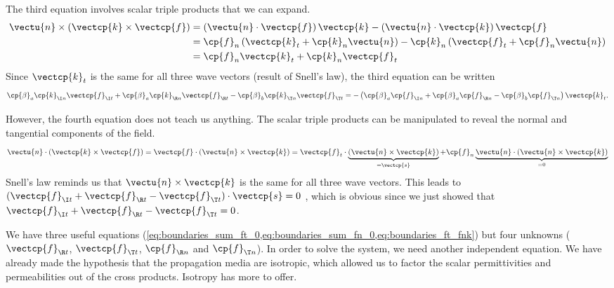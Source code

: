 \begin{refsection}
The third equation involves scalar triple products that we can expand.
\begin{subequations}
    \begin{align}
        \vectu{n} \times \left( \vectcp{k} \times \vectcp{f} \right)
        &=
        \left( \vectu{n} \cdot \vectcp{f} \right) \vectcp{k}
        -
        \left( \vectu{n} \cdot \vectcp{k} \right) \vectcp{f}
        \\
        &=
        \cp{f}_n \left( \vectcp{k}_t + \cp{k}_n \vectu{n} \right)
        -
        \cp{k}_n \left( \vectcp{f}_t + \cp{f}_n \vectu{n} \right)
        \\
        &=
        \cp{f}_n \vectcp{k}_t + \cp{k}_n \vectcp{f}_t
    \end{align}
\end{subequations}
Since $\vectcp{k}_t$ is the same for all three wave vectors (result of Snell's law), the third equation can be written
\begin{equation}
    \cp{\beta}_a \cp{k}_{\I n} \vectcp{f}_{\I t}
    +
    \cp{\beta}_a \cp{k}_{\R n} \vectcp{f}_{\R t}
    -
    \cp{\beta}_b \cp{k}_{\T n} \vectcp{f}_{\T t}
    =
    -
    \left(
        \cp{\beta}_a \cp{f}_{\I n}
        +
        \cp{\beta}_a \cp{f}_{\R n}
        -
        \cp{\beta}_b \cp{f}_{\T n}
    \right)
    \vectcp{k}_t
    \text{.}
    \label{eq:boundaries_ft_fnk}
\end{equation}

However, the fourth equation does not teach us anything.
The scalar triple products can be manipulated to reveal the normal and tangential components of the field.
\begin{equation}
    \vectu{n} \cdot \left( \vectcp{k} \times \vectcp{f} \right)
    =
    \vectcp{f} \cdot \left( \vectu{n} \times \vectcp{k} \right)
    =
    \vectcp{f}_t
    \cdot
    \underbrace{
        \left( \vectu{n} \times \vectcp{k} \right)
    }_{= \vectcp{s}}
    +
    \cp{f}_n
    \underbrace{
        \vectu{n}
        \cdot
        \left( \vectu{n} \times \vectcp{k} \right)
    }_{=0}
\end{equation}
Snell's law reminds us that $\vectu{n} \times \vectcp{k}$ is the same for all three wave vectors.
This leads to
$( \vectcp{f}_{\I t} + \vectcp{f}_{\R t} - \vectcp{f}_{\T t})
 \cdot
 \vectcp{s}
 = 0
$%
, which is obvious since we just showed that $\vectcp{f}_{\I t} + \vectcp{f}_{\R t} - \vectcp{f}_{\T t} = 0$.

We have three useful equations
(\cref{eq:boundaries_sum_ft_0,eq:boundaries_sum_fn_0,eq:boundaries_ft_fnk}) but four unknowns ($\vectcp{f}_{\R t}$, $\vectcp{f}_{\T t}$, $\cp{f}_{\R n}$ and $\cp{f}_{\T n}$).
In order to solve the system, we need another independent equation.
We have already made the hypothesis that the propagation media are isotropic, which allowed us to factor the scalar permittivities and permeabilities out of the cross products.
Isotropy has more to offer.




\end{refsection}
